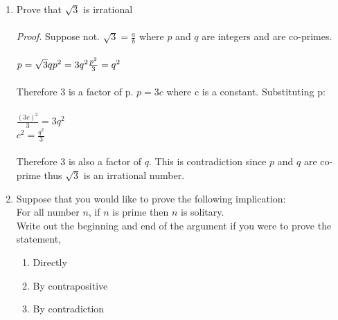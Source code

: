 \documentclass[11pt,a4paper]{article}
\newcommand\setItemNumber[1]{\setcounter{enumi}{\numexpr#1-1\relax}}
\begin{document}
\begin{enumerate}
        \setItemNumber{6}
        \item Prove that $\sqrt{3}$ is irrational\\\\
            \textit{Proof}. Suppose not. $\sqrt{3} = \frac{a}{b}$ where $p$ and $q$ are integers and are co-primes.\\\\$p = \sqrt{3}q\\ p^2 = 3q^2 \\ \frac{p^2}{3} = q^2$\\\\ Therefore  3 is a factor of p. $p = 3c$ where c is a constant. Substituting p:\\\\ $\frac{(3c)^2}{3} = 3q^2$\\$c^2 = \frac{q^2}{3}$\\\\ Therefore 3 is also a factor of $q$. This is contradiction since $p$ and $q$ are co-prime thus $\sqrt{3}$ is an irrational number.

        \setItemNumber{10}
        \item Suppose that you would like to prove the following implication:\\
            For all number $n$, if $n$ is prime then $n$ is solitary.\\
            Write out the beginning and end of the argument if you were to prove the statement,\\
            \begin{enumerate}
                \item Directly
                \item By contrapositive
                \item By contradiction
            \end{enumerate}

        \end{enumerate}
\end{document}
